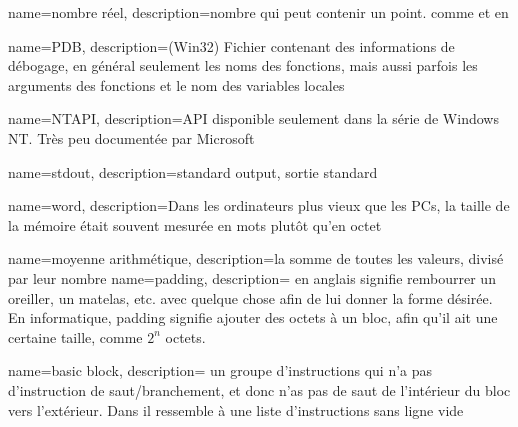 {
  name={nombre réel},
  description={nombre qui peut contenir un point. comme \Tfloat et \Tdouble en \CCpp}
}

{
  name=PDB,
  description={(Win32) Fichier contenant des informations de débogage, en général seulement les noms des fonctions,
  mais aussi parfois les arguments des fonctions et le nom des variables locales}
}

{
  name=NTAPI,
  description={\ac{API} disponible seulement dans la série de Windows NT. Très peu documentée par Microsoft}
}

{
  name=stdout,
  description={standard output, sortie standard}
}

{
  name=word,
  description={Dans les ordinateurs plus vieux que les PCs, la taille de la mémoire était
  souvent mesurée en mots plutôt qu'en octet}
}

{
  name={moyenne arithmétique},
  description={la somme de toutes les valeurs, divisé par leur nombre}
}
{
  name=padding,
  description={ en anglais signifie rembourrer un oreiller, un matelas, etc. avec quelque chose afin de lui donner la forme désirée.
  En informatique, padding signifie ajouter des octets à un bloc, afin qu'il ait une certaine taille, comme $2^n$ octets.}
}

{
  name=basic block,
  description={
	un groupe d'instructions qui n'a pas d'instruction de saut/branchement,
	et donc n'as pas de saut de l'intérieur du bloc vers l'extérieur.
	Dans \IDA il ressemble à une liste d'instructions sans ligne vide}
}
